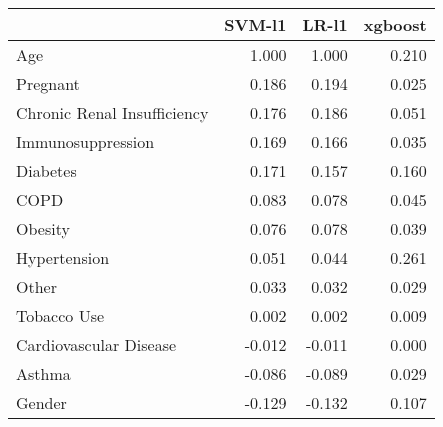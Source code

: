 \begin{tabular}{lrrr}
\toprule
{} &  SVM-l1 &  LR-l1 &  xgboost \\
\midrule
Age                         &   1.000 &  1.000 &    0.210 \\
Pregnant                    &   0.186 &  0.194 &    0.025 \\
Chronic Renal Insufficiency &   0.176 &  0.186 &    0.051 \\
Immunosuppression           &   0.169 &  0.166 &    0.035 \\
Diabetes                    &   0.171 &  0.157 &    0.160 \\
COPD                        &   0.083 &  0.078 &    0.045 \\
Obesity                     &   0.076 &  0.078 &    0.039 \\
Hypertension                &   0.051 &  0.044 &    0.261 \\
Other                       &   0.033 &  0.032 &    0.029 \\
Tobacco Use                 &   0.002 &  0.002 &    0.009 \\
Cardiovascular Disease      &  -0.012 & -0.011 &    0.000 \\
Asthma                      &  -0.086 & -0.089 &    0.029 \\
Gender                      &  -0.129 & -0.132 &    0.107 \\
\bottomrule
\end{tabular}
